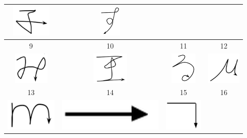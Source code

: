 \begin{table}
\begin{center}
\begin{tabular}{ c | c | c | c  }
    \includegraphics[width=0.2\linewidth, height=15mm]{./figures/gesture_7.png} &
    \includegraphics[width=0.2\linewidth, height=15mm]{./figures/gesture_su.png}  \\ \hline
    9 & 10 & 11 & 12  \\ \hline
    \includegraphics[width=0.2\linewidth, height=15mm]{./figures/gesture_mi.png} & 
    \includegraphics[width=0.2\linewidth, height=15mm]{./figures/gesture_wang.png} &
    \includegraphics[width=0.2\linewidth, height=15mm]{./figures/gesture_ru.png} &
    \includegraphics[width=0.2\linewidth, height=15mm]{./figures/gesture_miu.png}	\\ \hline
    13 & 14 & 15 & 16  \\ \hline
    \includegraphics[width=0.2\linewidth, height=15mm]{./figures/gesture_m.png} &
    \includegraphics[width=0.2\linewidth, height=15mm]{./figures/gesture_14.png} &
    \includegraphics[width=0.2\linewidth, height=15mm]{./figures/gesture_15.png} & 

\end{tabular}
\end{center}
\end{table}
